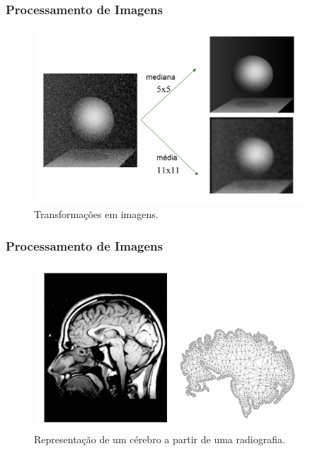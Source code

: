 \documentclass{beamer}
\begin{document}


\begin{frame}
\frametitle{Processamento de Imagens}
	
	\begin{figure}[!h]
		\begin{center}
			\includegraphics[width=0.9\textwidth]{Figures/pi}
			\caption{Transformações em imagens.}
		\end{center}
		
	\end{figure}
	

\end{frame}



\begin{frame}
\frametitle{Processamento de Imagens}
	
	\begin{figure}[!h]
		\begin{center}
			\includegraphics[width=0.9\textwidth]{Figures/cerebro}
			\caption{Representação de um cérebro a partir de uma radiografia.}
		\end{center}
		
	\end{figure}
	
\end{frame}
\end{document}
